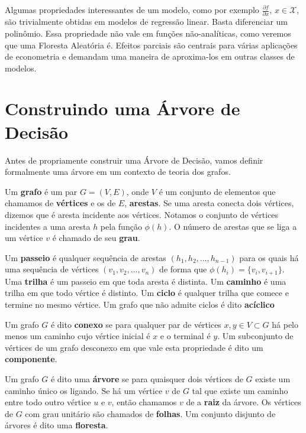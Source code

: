 Algumas propriedades interessantes de um modelo, como por exemplo $\frac{\partial f}{\partial x}, \, x \in \mathcal{X}$, são trivialmente obtidas em modelos de regressão linear. Basta diferenciar um polinômio. Essa propriedade não vale em funções não-analíticas, como veremos que uma Floresta Aleatória é. Efeitos parciais são centrais para várias aplicações de econometria e demandam uma maneira de aproxima-los em outras classes de modelos.

\section{Construindo uma Árvore de Decisão}

Antes de propriamente construir uma Árvore de Decisão, vamos definir formalmente uma árvore em um contexto de teoria dos grafos. 

\begin{defi}
Um \textbf{grafo} é um par $G = (V, E)$, onde $V$ é um conjunto de elementos que chamamos de \textbf{vértices} e os de $E$, \textbf{arestas}. Se uma aresta conecta dois vértices, dizemos que é aresta incidente aos vértices. Notamos o conjunto de vértices incidentes a uma aresta $h$ pela função $\phi(h)$. O número de arestas que se liga a um vértice $v$ é chamado de seu \textbf{grau}.
\end{defi}

\begin{defi}
Um \textbf{passeio} é qualquer sequência de arestas $(h_1, h_2, ..., h_{n-1})$ para os quais há uma sequência de vértices $(v_1, v_2, ..., v_n)$ de forma que $\phi(h_i) = \{v_i, v_{i+1}\}$. Uma \textbf{trilha} é um passeio em que toda aresta é distinta. Um \textbf{caminho} é uma trilha em que todo vértice é distinto. Um \textbf{ciclo} é qualquer trilha que comece e termine no mesmo vértice. Um grafo que não admite ciclos é dito \textbf{acíclico}
\end{defi}

\begin{defi}
Um grafo $G$ é dito \textbf{conexo} se para qualquer par de vértices $x, y \in V \subset G$ há pelo menos um caminho cujo vértice inicial é $x$ e o terminal é $y$. Um subconjunto de vértices de um grafo desconexo em que vale esta propriedade é dito um \textbf{componente}.
\end{defi}


\begin{defi}
Um grafo $G$ é dito uma \textbf{árvore} se para quaisquer dois vértices de $G$ existe um caminho único os ligando. Se há um vértice $v$ de $G$ tal que existe um caminho entre todo outro vértice $u$ e $v$, então chamamos $v$ de a \textbf{raiz} da árvore. Os vértices de $G$ com grau unitário são chamados de \textbf{folhas}. Um conjunto disjunto de árvores é dito uma \textbf{floresta}.
\end{defi}

